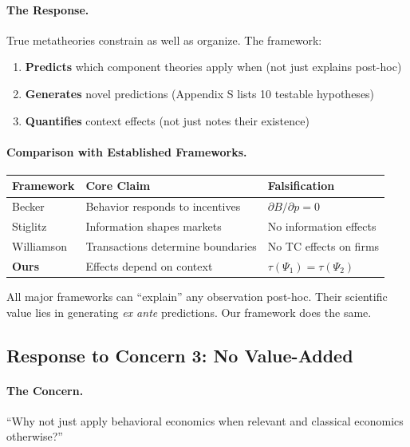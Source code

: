 \documentclass[12pt,a4paper]{article}
\begin{document}
\paragraph{The Response.}
True metatheories constrain as well as organize. The framework:
\begin{enumerate}
    \item \textbf{Predicts} which component theories apply when (not just explains post-hoc)
    \item \textbf{Generates} novel predictions (Appendix S lists 10 testable hypotheses)
    \item \textbf{Quantifies} context effects (not just notes their existence)
\end{enumerate}

\paragraph{Comparison with Established Frameworks.}

\begin{center}
\renewcommand{\arraystretch}{1.3}
\begin{tabular}{lll}
\hline
\textbf{Framework} & \textbf{Core Claim} & \textbf{Falsification} \\
\hline
Becker & Behavior responds to incentives & $\partial B/\partial p = 0$ \\
Stiglitz & Information shapes markets & No information effects \\
Williamson & Transactions determine boundaries & No TC effects on firms \\
\textbf{Ours} & Effects depend on context & $\tau(\Psi_1) = \tau(\Psi_2)$ \\
\hline
\end{tabular}
\end{center}

All major frameworks can ``explain'' any observation post-hoc. Their scientific value lies in generating \textit{ex ante} predictions. Our framework does the same.

\subsection{Response to Concern 3: No Value-Added}

\paragraph{The Concern.}
``Why not just apply behavioral economics when relevant and classical economics otherwise?''
\end{document}
